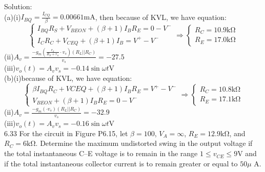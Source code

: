 \documentclass[a4paper,11pt,UTF8]{article}
\begin{document}
\noindent Solution:\\
(a)(i)$\displaystyle I_{BQ}=\frac{I_{CQ}}{\beta}=0.00661\mathrm{mA}$, then because of KVL, we have equation:
$$\begin{cases}
	I_{BQ}R_S+V_{BE{ON}}+(\beta+1)I_BR_E=0-V^-\\
	I_CR_C+V_{CEQ}+(\beta+1)I_B=V^+-V^-
\end{cases}\Rightarrow
\begin{cases}
	R_C=10.9\mathrm{k\Omega}\\
	R_E=17.0\mathrm{k\Omega}
\end{cases}
$$
(ii)$\displaystyle A_v=\frac{-g_m(\displaystyle\frac{r_\pi}{R_S+r_\pi}\cdot v_s)(R_L||R_C)}{v_s}=-27.5$\\
(iii)$v_o(t)=A_vv_s=-0.14\sin\omega t\mathrm{V}$\\
(b)(i)because of KVL, we have equation:
$$\begin{cases}
	\beta I_{BQ}R_C+V{CEQ}+(\beta+1)I_BR_E=V^+-V^-\\
	V_{BE{ON}}+(\beta+1)I_BR_E=0-V^-
\end{cases}\Rightarrow
\begin{cases}
	R_C=10.8\mathrm{k\Omega}\\
	R_E=17.1\mathrm{k\Omega}
\end{cases}
$$
(ii)$\displaystyle A_v=\frac{-g_m(\displaystyle\cdot v_s)(R_L||R_C)}{v_s}=-32.9$\\
(iii)$v_o(t)=A_vv_s=-0.16\sin\omega t\mathrm{V}$\\
6.33 For the circuit in Figure P6.15, let $\beta = 100$, $V_A =\infty$, $R_E = 12.9 \mathrm{k\Omega}$, and
$R_C = 6 \mathrm{k\Omega}$. Determine the maximum undistorted swing in the output voltage if the total instantaneous C–E voltage is to remain in the range
$1 \leq v_{CE} \leq 9 $V and if the total instantaneous collector current is to remain greater or equal to $50 \mu$ A.
\end{document}
